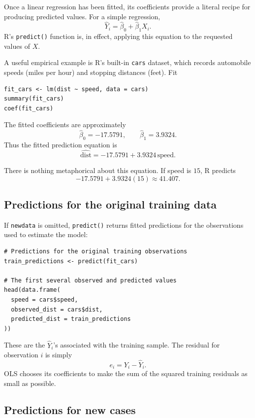 \documentclass[11pt]{report}
\begin{document}
Once a linear regression has been fitted, its coefficients provide a literal recipe for producing predicted values. For a simple regression,
\[
\widehat{Y}_i
=
\widehat{\beta}_0+
\widehat{\beta}_1X_i.
\]
R's \texttt{predict()} function is, in effect, applying this equation to the requested values of \(X\).

A useful empirical example is R's built-in \texttt{cars} dataset, which records automobile speeds (miles per hour) and stopping distances (feet). Fit

\begin{lstlisting}
fit_cars <- lm(dist ~ speed, data = cars)
summary(fit_cars)
coef(fit_cars)
\end{lstlisting}

The fitted coefficients are approximately
\[
\widehat{\beta}_0=-17.5791,
\qquad
\widehat{\beta}_1=3.9324.
\]
Thus the fitted prediction equation is
\[
\boxed{
\widehat{\text{dist}}
=
-17.5791 + 3.9324\,\text{speed}.
}
\]

There is nothing metaphorical about this equation. If speed is \(15\), R predicts
\[
-17.5791 + 3.9324(15)
\approx 41.407.
\]

\subsection{Predictions for the original training data}

If \texttt{newdata} is omitted, \texttt{predict()} returns fitted predictions for the observations used to estimate the model:

\begin{lstlisting}
# Predictions for the original training observations
train_predictions <- predict(fit_cars)

# The first several observed and predicted values
head(data.frame(
  speed = cars$speed,
  observed_dist = cars$dist,
  predicted_dist = train_predictions
))
\end{lstlisting}

These are the \(\widehat{Y}_i\)'s associated with the training sample. The residual for observation \(i\) is simply
\[
e_i=Y_i-\widehat{Y}_i.
\]
OLS chooses its coefficients to make the sum of the squared training residuals as small as possible.

\subsection{Predictions for new cases}
\end{document}

